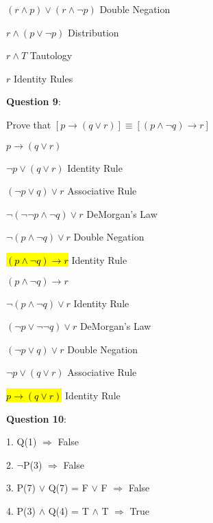 \documentclass{article} %
\newcommand{\question}[2][]{\begin{flushleft}
        \textbf{Question #1}: \textit{#2}

\end{flushleft}}
\begin{document}
        $(r \land p) \lor (r \land \neg p)$ \tabto*{5cm} Double Negation \hspace*{2cm}

        $r \land (p \lor \neg p)$ \tabto*{5cm} Distribution

        $r \land T$ \tabto*{5cm} Tautology

        $r$ \tabto*{5cm} Identity Rules

    \question[9]{}

        Prove that $[p \rightarrow (q \lor r)] \equiv [(p \land \neg q) \rightarrow r]$

        \hspace{0cm}

        $p \rightarrow (q \lor r)$

        $\neg p \lor (q \lor r)$ \tabto*{3.5cm} Identity Rule
        
        $(\neg p \lor q) \lor r$ \tabto*{3.5cm} Associative Rule

        $\neg (\neg \neg p \land \neg q) \lor r$ \tabto*{3.5cm} DeMorgan's Law

        $\neg (p \land \neg q) \lor r$ \tabto*{3.5cm} Double Negation

        \hl{$(p \land \neg q) \rightarrow r$} \tabto*{3.5cm} Identity Rule

        \hspace{0cm}

        $(p \land \neg q) \rightarrow r$

        $\neg(p \land \neg q) \lor r$ \tabto*{3.5cm} Identity Rule

        $(\neg p \lor \neg \neg q) \lor r$ \tabto*{3.5cm} DeMorgan's Law

        $(\neg p \lor q) \lor r$ \tabto*{3.5cm} Double Negation

        $\neg p \lor (q \lor r)$ \tabto*{3.5cm} Associative Rule

        \hl{$p \rightarrow (q \lor r)$} \tabto*{3.5cm} Identity Rule

    \question[10]{}

        1. Q(1) $\Rightarrow$ False

        2. $\neg$P(3) $\Rightarrow$ False

        3. P(7) $\lor$ Q(7) = F $\lor$ F $\Rightarrow$ False

        4. P(3) $\land$ Q(4) = T $\land$ T $\Rightarrow$ True
\end{document}
